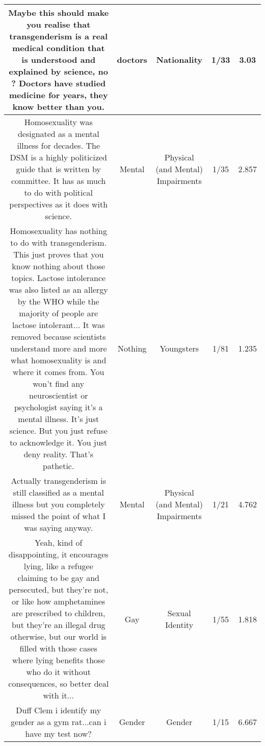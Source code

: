 \documentclass[11pt]{article}
\newlength\mylength
\begin{document}
\begin{center}
\begin{longtable}{|C{.40\mylength}|C{.30\mylength}|C{.15\mylength}|C{.15\mylength}|C{.15\mylength}|}
  Maybe this should make you realise that transgenderism is a real medical condition that is understood and explained by science, no ? Doctors have studied medicine for years, they know better than you.  & doctors & Nationality & 1/33 & 3.03 \\  \hline
  Homosexuality was designated as a mental illness for decades. The DSM is a highly politicized guide that is written by committee. It has as much to do with political perspectives as it does with science.  & Mental & Physical (and Mental) Impairments & 1/35 & 2.857 \\  \hline
  Homosexuality has nothing to do with transgenderism. This just proves that you know nothing about those topics. Lactose intolerance was also listed as an allergy by the WHO while the majority of people are lactose intolerant... It was removed because scientists understand more and more what homosexuality is and where it comes from. You won't find any neuroscientist or psychologist saying it's a mental illness. It's just science. But you just refuse to acknowledge it. You just deny reality. That's pathetic.  & Nothing & Youngsters & 1/81 & 1.235 \\  \hline
  Actually transgenderism is still classified as a mental illness but you completely missed the point of what I was saying anyway.  & Mental & Physical (and Mental) Impairments & 1/21 & 4.762 \\  \hline
  Yeah, kind of disappointing, it encourages lying, like a refugee claiming to be gay and persecuted, but they're not, or like how amphetamines are prescribed to children, but they're an illegal drug otherwise, but our world is filled with those cases where lying benefits those who do it without consequences, so better deal with it...  & Gay & Sexual Identity & 1/55 & 1.818 \\  \hline
  Duff Clem i identify my gender as a gym rat...can i have my test now?  & Gender & Gender & 1/15 & 6.667 \\  \hline

\end{longtable}
\end{center}
\end{document}
